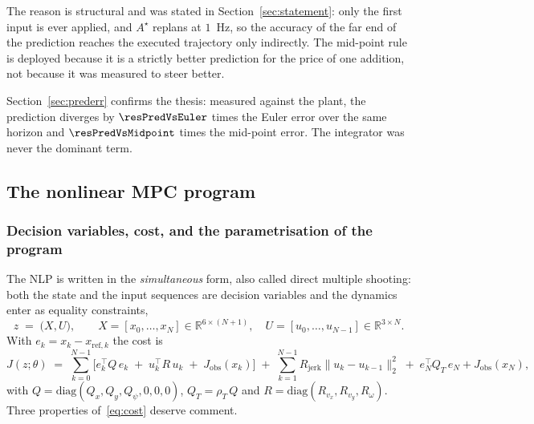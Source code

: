 \documentclass[11pt,a4paper]{article}
\newcommand{\R}{\mathbb{R}}
\newcommand{\astar}{$A^\star$}
\newcommand{\Jobs}{J_{\mathrm{obs}}}
\newcommand{\Rjerk}{R_{\mathrm{jerk}}}
\begin{document}
\begin{table}[htbp]
  \centering
  \small
  \caption{%
  Closed-loop cost with the two integrators, same profile otherwise. A positive $\Delta$ means the
  mid-point rule is cheaper.}
  \label{res:tab:integloop}
\end{table}

The reason is structural and was stated in Section~\ref{sec:statement}: only the first input is ever applied,
and \astar{} replans at $1$~Hz, so the accuracy of the far end of the prediction reaches the executed
trajectory only indirectly. The mid-point rule is deployed because it is a strictly better prediction for the
price of one addition, not because it was measured to steer better.

Section~\ref{sec:prederr} confirms the thesis: measured against
the plant, the prediction diverges by $\resPredVsEuler$ times the Euler error over the same horizon and
$\resPredVsMidpoint$ times the mid-point error. The integrator was never the dominant term.

\subsection{The nonlinear MPC program}
\label{sec:nlp}

\subsubsection{Decision variables, cost, and the parametrisation of the program}
\label{sec:shoot}

The NLP is written in the \emph{simultaneous} form, also called direct multiple shooting: both the state and
the input sequences are decision variables and the dynamics enter as equality constraints,
\begin{equation}
  z \;=\; \big(X,U\big),\qquad X=[x_0,\dots,x_N]\in\R^{6\times(N+1)},\quad U=[u_0,\dots,u_{N-1}]\in\R^{3\times N}.
\end{equation}
With $e_k=x_k-x_{\mathrm{ref},k}$ the cost is
\begin{equation}
  J(z;\theta) \;=\;
  \sum_{k=0}^{N-1}\Big[e_k^{\!\top} Q\, e_k
  \;+\; u_k^{\!\top} R\, u_k
  \;+\; \Jobs(x_k)\Big]
  \;+\;\sum_{k=1}^{N-1}\Rjerk\|u_k-u_{k-1}\|_2^2
  \;+\;e_N^{\!\top} Q_T\, e_N + \Jobs(x_N),
  \label{eq:cost}
\end{equation}
with $Q=\mathrm{diag}(Q_x,Q_y,Q_\psi,0,0,0)$, $Q_T=\rho_T\,Q$ and $R=\mathrm{diag}(R_{v_x},R_{v_y},R_\omega)$.
Three properties of~\eqref{eq:cost} deserve comment.
\end{document}
